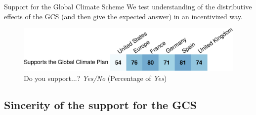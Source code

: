 \documentclass[aspectratio=169,xcolor=dvipsnames, 11pt,mathserif]{beamer}
\begin{document}
\begin{framefont}{\small}
\begin{frame}{Support for the Global Climate Scheme\label{gcs_support}}
\bbvsp %
\ip We test understanding of the distributive effects of the GCS%
(and then give the expected answer) in an incentivized way.%
\hyperlink{understanding}{}
\ee \vspace{-.3cm}
    \begin{figure}
        \centering %
        \caption{Do you support...? \textit{Yes/No} (Percentage of \textit{Yes}) \hyperlink{gcs_perceptions}{} \hyperlink{conjoint_ab}{} \hyperlink{gcs_vote}{} \hyperlink{national_policies}{}}
        \includegraphics[width=\textwidth]{../figures/country_comparison/gcs_support_positive.pdf} %
    \end{figure}
\end{frame}

\subsection{Sincerity of the support for the GCS}



\end{framefont}
\end{document}
